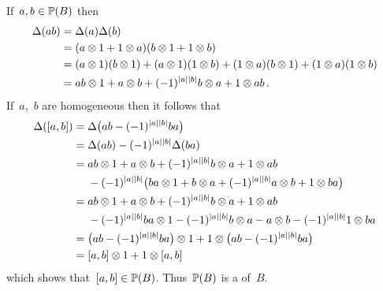 \documentclass[a4paper,10pt,headings=standardclasses]{scrartcl}
\begin{document}
\begin{enumerate}
    If~$a, b \in \mathbb{P}(B)$ then
    \begin{align*}
      \Delta(ab)
      &=
      \Delta(a) \Delta(b)
      \\
      &=
      (a \otimes 1 + 1 \otimes a)
      (b \otimes 1 + 1 \otimes b)
      \\
      &=
        (a \otimes 1)(b \otimes 1)
      + (a \otimes 1)(1 \otimes b)
      + (1 \otimes a)(b \otimes 1)
      + (1 \otimes a)(1 \otimes b)
      \\
      &=
        ab \otimes 1
      + a \otimes b
      + (-1)^{\lvert a\rvert \lvert b\rvert}
        b \otimes a
      + 1 \otimes ab \,.
    \end{align*}
    If~$a$,~$b$ are homogeneous then it follows that
    \begingroup
    \allowdisplaybreaks
    \begin{align*}
        \Delta([a,b])
        ={}&
        \Delta\bigl( ab - (-1)^{\lvert a\rvert \lvert b\rvert} ba \bigr)
        \\
        ={}&
          \Delta(ab)
        - (-1)^{\lvert a\rvert \lvert b\rvert}
        \Delta(ba)
      \\
        ={}&
          ab \otimes 1
        + a \otimes b
        + (-1)^{\lvert a\rvert \lvert b\rvert}
          b \otimes a
        + 1 \otimes ab
      \\
        {}&
        - (-1)^{\lvert a\rvert \lvert b\rvert}
        \bigl(
            ba \otimes 1
          + b \otimes a
          + (-1)^{\lvert a\rvert \lvert b\rvert}
            a \otimes b
          + 1 \otimes ba
        \bigr)
      \\
        ={}&
          ab \otimes 1
        + a \otimes b
        + (-1)^{\lvert a\rvert \lvert b\rvert}
          b \otimes a
        + 1 \otimes ab
        \\
        {}&
        - (-1)^{\lvert a\rvert \lvert b\rvert}
          ba \otimes 1
        - (-1)^{\lvert a\rvert \lvert b\rvert}
          b \otimes a
        - a \otimes b
        - (-1)^{\lvert a\rvert \lvert b\rvert}
          1 \otimes ba
      \\
        ={}&
          \bigl( ab - (-1)^{\lvert a\rvert \lvert b\rvert} ba \bigr) \otimes 1
        + 1 \otimes \bigl( ab - (-1)^{\lvert a\rvert \lvert b\rvert} ba \bigr)
      \\
        ={}&
        [a,b] \otimes 1 + 1 \otimes [a,b]
    \end{align*}
    \endgroup
    which shows that~$[a,b] \in \mathbb{P}(B)$.
    Thus~$\mathbb{P}(B)$ is a {\dglsub} of~$B$.
\end{enumerate}











\printbibliography
\end{document}

